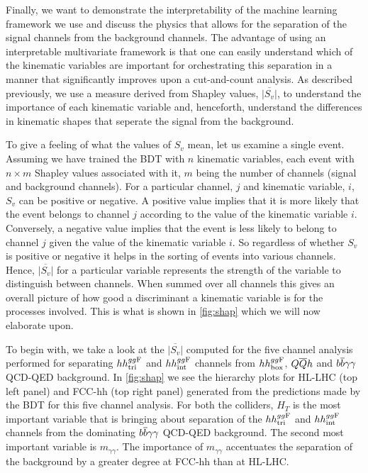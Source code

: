 Finally, we want to demonstrate the interpretability of the machine learning framework we use and discuss the physics that allows for the separation of the signal channels from the background channels. The advantage of using an interpretable multivariate framework is that one can easily understand which of the kinematic variables are important for orchestrating this separation in a manner that significantly improves upon a cut-and-count analysis. As described previously, we use a measure derived from Shapley values, $\overline{|S_v|}$, to understand the importance of each kinematic variable and, henceforth, understand the differences in kinematic shapes that seperate the signal from the background.

To give a feeling of what the values of $S_v$ mean, let us examine a single event. Assuming we have trained the BDT with $n$ kinematic variables, each event with $n\times m$ Shapley values associated with it, $m$ being the number of channels (signal and background channels). For a particular channel, $j$ and kinematic variable, $i$, $S_v$ can be positive or negative. A positive value implies that it is more likely  that the event belongs to channel $j$ according to the value of the kinematic variable $i$. Conversely, a negative value implies that the event is less likely to belong to channel $j$ given the value of the kinematic variable $i$. So regardless of whether $S_v$ is positive or negative it helps in the sorting of events into various channels. Hence, $\overline{|S_v|}$ for a particular variable represents the strength of the variable to distinguish between channels. When summed over all channels this gives an overall picture of how good a discriminant a kinematic variable is for the processes involved. This is what is shown in \autoref{fig:shap} which we will now elaborate upon.

To begin with, we take a look at the $\overline{|S_v|}$ computed for the five channel analysis performed for separating $hh^{gg\rm F}_{\rm tri}$ and $hh^{gg\rm F}_{\rm int}$ channels from $hh^{gg\rm F}_{\rm box}$, $Q\overline Q h$ and $b\overline b\gamma\gamma$ QCD-QED background. In \autoref{fig:shap} we see the hierarchy plots for HL-LHC (top left panel) and FCC-hh (top right panel) generated from the predictions made by the BDT for this five channel analysis. For both the colliders, $H_T$ is the most important variable that is bringing about separation of the $hh^{gg\rm F}_{\rm tri}$ and $hh^{gg\rm F}_{\rm int}$ channels from the dominating $b\overline b\gamma\gamma$ QCD-QED background. The second most important variable is $m_{\gamma\gamma}$. The importance of $m_{\gamma\gamma}$ accentuates the separation of the background by a greater degree at FCC-hh than at HL-LHC.

